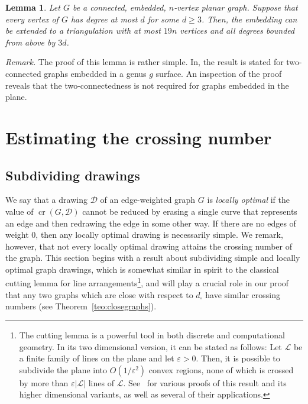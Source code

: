 \documentclass{article}
\newcounter{contSect} \numberwithin{contSect}{section}
\newtheorem{lemma}[contSect]{Lemma}
\begin{document}
\begin{lemma}
    Let $G$ be a connected, embedded, $n$-vertex planar graph. Suppose that every vertex of $G$ has degree at most $d$ for some $d\geq 3$. Then, the embedding can be extended to a triangulation with at most $19n$ vertices and all degrees bounded from above by $3d$.
\end{lemma}

\noindent\textit{Remark.} The proof of this lemma is rather simple. In\cite{pach2005crossing}, the result is stated for two-connected graphs embedded in a genus $g$ surface. An inspection of the proof reveals that the two-connectedness is not required for graphs embedded in the plane. 

\section{Estimating the crossing number}\label{sec:estimatingcr}

\subsection{Subdividing drawings}

We say that a drawing $\mathcal{D}$ of an edge-weighted graph $G$ is \textit{locally optimal} if the value of $\mathop{\mathrm{cr}}(G,\mathcal{D})$ cannot be reduced by erasing a single curve that represents an edge and then redrawing the edge in some other way. If there are no edges of weight $0$, then any locally optimal drawing is necessarily simple. We remark, however, that not every locally optimal drawing attains the crossing number of the graph. This section begins with a result about subdividing simple and locally optimal graph drawings, which is somewhat similar in spirit to the classical cutting lemma for line arrangements\footnote{The cutting lemma is a powerful tool in both discrete and computational geometry. In its two dimensional version, it can be stated as follows: Let $\mathcal{L}$ be a finite family of lines on the plane and let $\varepsilon>0$. Then, it is possible to subdivide the plane into $O(1/\varepsilon^2)$ convex regions, none of which is crossed by more than $\varepsilon|\mathcal{L}|$ lines of $\mathcal{L}$. See~\cite{cuttingsapplications1,cuttingsapplications2} for various proofs of this result and its higher dimensional variants, as well as several of their applications.}, and will play a crucial role in our proof that any two graphs which are close with respect to $d_\square$ have similar crossing numbers (see Theorem~\ref{teo:closegraphs}).
\end{document}
